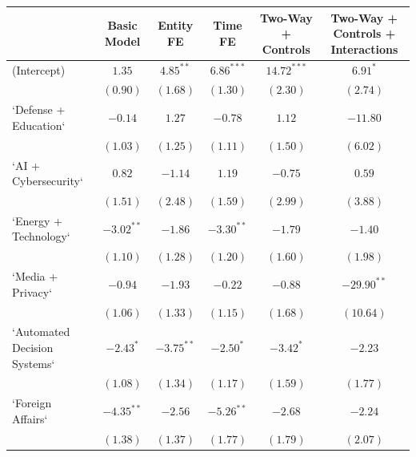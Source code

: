 
\begin{table}
\begin{center}
\begin{tabular}{l c c c c c}
\hline
 & Basic Model & Entity FE & Time FE & Two-Way + Controls & Two-Way + Controls + Interactions \\
\hline
(Intercept)                                       & $1.35$       & $4.85^{**}$   & $6.86^{***}$  & $14.72^{***}$ & $6.91^{*}$    \\
                                                  & $(0.90)$     & $(1.68)$      & $(1.30)$      & $(2.30)$      & $(2.74)$      \\
`Defense + Education`                             & $-0.14$      & $1.27$        & $-0.78$       & $1.12$        & $-11.80$      \\
                                                  & $(1.03)$     & $(1.25)$      & $(1.11)$      & $(1.50)$      & $(6.02)$      \\
`AI + Cybersecurity`                              & $0.82$       & $-1.14$       & $1.19$        & $-0.75$       & $0.59$        \\
                                                  & $(1.51)$     & $(2.48)$      & $(1.59)$      & $(2.99)$      & $(3.88)$      \\
`Energy + Technology`                             & $-3.02^{**}$ & $-1.86$       & $-3.30^{**}$  & $-1.79$       & $-1.40$       \\
                                                  & $(1.10)$     & $(1.28)$      & $(1.20)$      & $(1.60)$      & $(1.98)$      \\
`Media + Privacy`                                 & $-0.94$      & $-1.93$       & $-0.22$       & $-0.88$       & $-29.90^{**}$ \\
                                                  & $(1.06)$     & $(1.33)$      & $(1.15)$      & $(1.68)$      & $(10.64)$     \\
`Automated Decision Systems`                      & $-2.43^{*}$  & $-3.75^{**}$  & $-2.50^{*}$   & $-3.42^{*}$   & $-2.23$       \\
                                                  & $(1.08)$     & $(1.34)$      & $(1.17)$      & $(1.59)$      & $(1.77)$      \\
`Foreign Affairs`                                 & $-4.35^{**}$ & $-2.56$       & $-5.26^{**}$  & $-2.68$       & $-2.24$       \\
                                                  & $(1.38)$     & $(1.37)$      & $(1.77)$      & $(1.79)$      & $(2.07)$      \\

\end{tabular}
\end{center}
\end{table}
